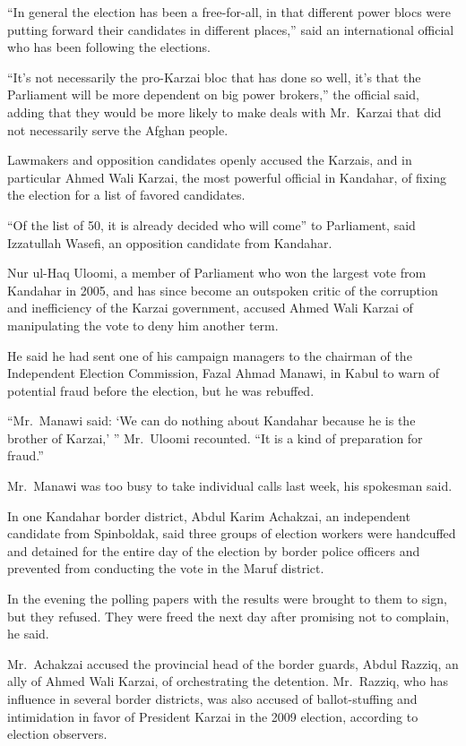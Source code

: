 ﻿\documentclass[12pt]{article}
\begin{document}
``In general the election has been a free-for-all, in that different power blocs were putting
forward their candidates in different places,'' said an international official who has been
following the elections.

``It's not necessarily the pro-Karzai bloc that has done so well, it's that the Parliament will be
more dependent on big power brokers,'' the official said, adding that they would be more likely to
make deals with Mr.~Karzai that did not necessarily serve the Afghan people.

Lawmakers and opposition candidates openly accused the Karzais, and in particular Ahmed Wali Karzai,
the most powerful official in Kandahar, of fixing the election for a list of favored candidates.

``Of the list of 50, it is already decided who will come'' to Parliament, said Izzatullah Wasefi, an
opposition candidate from Kandahar.

Nur ul-Haq Uloomi, a member of Parliament who won the largest vote from Kandahar in 2005, and has
since become an outspoken critic of the corruption and inefficiency of the Karzai government,
accused Ahmed Wali Karzai of manipulating the vote to deny him another term.

He said he had sent one of his campaign managers to the chairman of the Independent Election
Commission, Fazal Ahmad Manawi, in Kabul to warn of potential fraud before the election, but he was
rebuffed.

``Mr.~Manawi said: `We can do nothing about Kandahar because he is the brother of Karzai,' ''
Mr.~Uloomi recounted. ``It is a kind of preparation for fraud.''

Mr.~Manawi was too busy to take individual calls last week, his spokesman said.

In one Kandahar border district, Abdul Karim Achakzai, an independent candidate from Spinboldak,
said three groups of election workers were handcuffed and detained for the entire day of the
election by border police officers and prevented from conducting the vote in the Maruf district.

In the evening the polling papers with the results were brought to them to sign, but they refused.
They were freed the next day after promising not to complain, he said.

Mr.~Achakzai accused the provincial head of the border guards, Abdul Razziq, an ally of Ahmed Wali
Karzai, of orchestrating the detention. Mr.~Razziq, who has influence in several border districts,
was also accused of ballot-stuffing and intimidation in favor of President Karzai in the 2009
election, according to election observers.
\end{document}
